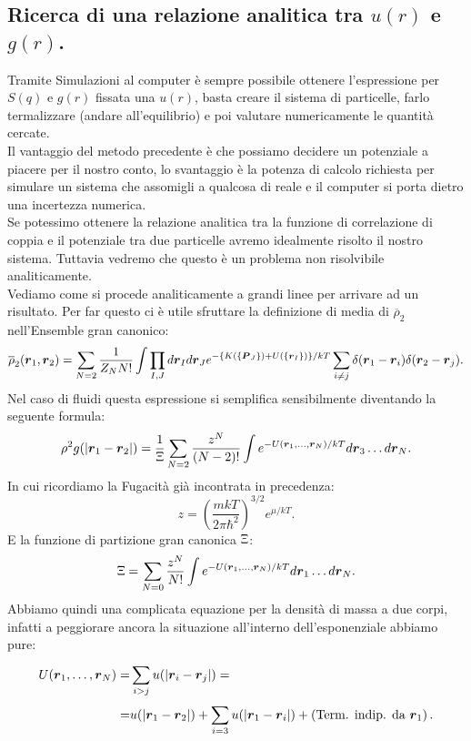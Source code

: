 \subsection{Ricerca di una relazione analitica tra $u(r)$ e $g(r)$.}
\label{subsec:Ricerca di una relazione analitica tra $u(r)$ e $g(r)$.}
Tramite Simulazioni al computer è sempre possibile ottenere l'espressione per $S(q)$ e $g(r)$ fissata una $u(r)$, basta creare il sistema di particelle, farlo termalizzare (andare all'equilibrio) e poi valutare numericamente le quantità cercate. \\
Il vantaggio del metodo precedente è che possiamo decidere un potenziale a piacere per il nostro conto, lo svantaggio è la potenza di calcolo richiesta per simulare un sistema che assomigli a qualcosa di reale e il computer si porta dietro una incertezza numerica.\\
Se potessimo ottenere la relazione analitica tra la funzione di correlazione di coppia e il potenziale tra due particelle avremo idealmente risolto il nostro sistema. Tuttavia vedremo che questo è un problema non risolvibile analiticamente.\\
Vediamo come si procede analiticamente a grandi linee per arrivare ad un risultato. Per far questo ci è utile sfruttare la definizione di media di $\overline{\rho }_2$ nell'Ensemble gran canonico:
\[
	\overline{\rho }_2(\boldsymbol{r}_1,\boldsymbol{r}_2) =
	\sum_{N=2}^{} \frac{1}{Z_N N!}\int \prod_{I,J}^{} d \boldsymbol{r}_I d \boldsymbol{r}_J 
	e^{
	-\left\{ K(\left\{ \boldsymbol{P}_J \right\}) + U(\left\{ \boldsymbol{r}_I \right\} ) \right\}/kT }
	\sum_{i\neq j}^{} \delta(\boldsymbol{r}_1-\boldsymbol{r}_i)\delta(\boldsymbol{r}_2-\boldsymbol{r}_j)
.\] 
Nel caso di fluidi questa espressione si semplifica sensibilmente diventando la seguente formula:
\[
	\rho ^2g(\left| \boldsymbol{r}_1-\boldsymbol{r}_2 \right|)
	=
	\frac{1}{\Upxi}
	\sum_{N=2}^{} \frac{z^{N}}{(N-2)!}
	\int e^{-U(\boldsymbol{r}_1,\ldots,\boldsymbol{r}_N)/kT} d \boldsymbol{r}_3\ldots d \boldsymbol{r}_N
	\label{eq:brutta-eq}
.\] 
In cui ricordiamo la Fugacità già incontrata in precedenza:
\[
	z = \left( \frac{mkT}{2\pi\hbar ^2} \right) ^{3/2}e^{\mu /kT}
.\] 
E la funzione di partizione gran canonica $\Upxi$:
\[
	\Upxi = 
	\sum_{N=0}^{} \frac{z^{N}}{N!}\int e^{-U(\boldsymbol{r}_1,\ldots,\boldsymbol{r}_N)/kT}
	d \boldsymbol{r}_1\ldots d \boldsymbol{r}_N
.\] 
Abbiamo quindi una complicata equazione per la densità di massa a due corpi, infatti a peggiorare ancora la situazione all'interno dell'esponenziale abbiamo pure:
\[\begin{aligned}
	U(\boldsymbol{r}_1,\ldots,\boldsymbol{r}_N) =&
	\sum_{i>j}^{} u(\left| \boldsymbol{r}_i - \boldsymbol{r}_j \right| )=\\
	=&
	u(\left| \boldsymbol{r}_1-\boldsymbol{r}_2 \right| ) 
	+
	\sum_{i=3}^{} u(\left| \boldsymbol{r}_1-\boldsymbol{r}_i \right| ) 
	+
	\left( \text{Term. indip. da } \boldsymbol{r}_1 \right) 
.\end{aligned}\]
